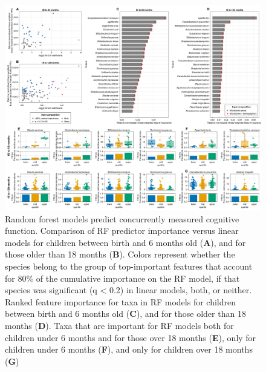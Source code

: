 \documentclass{article}
\begin{document}
\begin{figure}
    \centering
    \includegraphics[width=\textwidth]{assets/Figure3.png}
    \caption{
        Random forest models predict concurrently measured cognitive function.
        Comparison of RF predictor importance versus linear models for children
        between birth and 6 months old (\textbf{A}), and for those older than 18 months
        (\textbf{B}). Colors represent whether the species belong to the group of
        top-important features that account for 80\% of the cumulative
        importance on the RF model, if that species was significant (q
        \textless{} 0.2) in linear models, both, or neither. Ranked feature
        importance for taxa in RF models for children between birth and 6 months
        old (\textbf{C}), and for those older than 18 months (\textbf{D}). Taxa that are important
        for RF models both for children under 6 months and for those over 18
        months (\textbf{E}), only for children under 6 months (\textbf{F}), and only for children
        over 18 months (\textbf{G})
    }
    \label{fig:3}
\end{figure}
\end{document}
